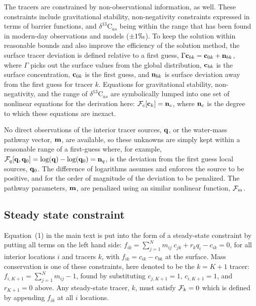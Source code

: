 \documentclass[agums]{aguplus}  %
\begin{document}
The tracers are constrained by non-observational information, as well.
These constraints include gravitational stability, non-negativity
constraints expressed in terms of barrier functions, and
$\delta^{13}$C$_{as}$ being within the range that has been found in
modern-day observations and models ($\pm 1\permil$).  To keep
the solution within reasonable bounds and also improve the efficiency
of the solution method, the surface tracer deviation is defined
relative to a first guess, $\Gamma {\bf c}_{bk} = {\bf c}_{0k} + {\bf
  n}_{bk}$, where $\Gamma$ picks out the surface values from the
global distribution, ${\bf c}_{bk}$ is the surface concentration,
${\bf c}_{0k}$ is the first guess, and ${\bf n}_{bk}$ is surface
deviation away from the first guess for tracer $k$. Equations for
gravitational stability, non-negativity, and the range of
$\delta^{13}$C$_{as}$ are symbolically lumped into one set of
nonlinear equations for the derivation here: ${\cal F}_c[{\bf c}_k] =
{\bf n}_c$, where ${\bf n}_c$ is the degree to which these equations
are inexact.

No direct observations of the interior tracer sources, ${\bf q}$, or
the water-mass pathway vector, ${\bf m}$, are available, so these
unknowns are simply kept within a reasonable range of a first-guess
where, for example, ${\cal F}_q[{\bf q},{\bf q}_0]=\mbox{log}({\bf q})
- \mbox{log}({\bf q}_0)={\bf n}_q$, is the deviation from the first
guess local sources, ${\bf q}_0$. The difference of logarithms assumes
and enforces the source to be positive, and for the order of magnitude
of the deviation to be penalized. The pathway parameters, ${\bf m}$,
are penalized using an similar nonlinear function, ${\cal F}_m$.

\subsection{Steady state constraint}

Equation~(1) in the main text is put into the form of a steady-state
constraint by putting all terms on the left hand side:
$f_{ik} = \sum^N_{j=1} m_{ij}~ c_{jk} + r_k q_i - c_{ik} = 0$,
for all interior locations $i$ and tracers $k$, with $f_{ik} = c_{ik} - c_{bk}$
at the surface.  Mass conservation is one of these constraints, here
denoted to be the $k=K+1$ tracer: $f_{i,K+1} = \sum^N_{j=1} m_{ij} -
1$, found by substituting $c_{j,K+1}=1$, $c_{i,K+1}=1$, and $r_{K+1} =
0$ above.  Any steady-state tracer, $k$, must satisfy ${\cal F}_k = 0$
which is defined by appending $f_{ik}$ at all $i$ locations.
\end{document}
